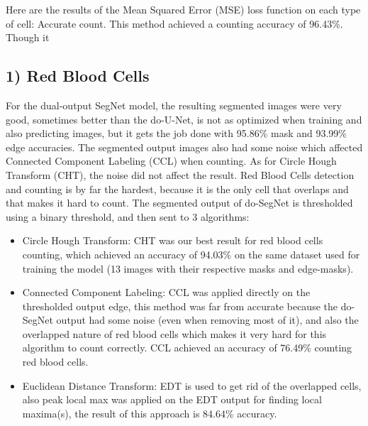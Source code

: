 \documentclass[conference]{IEEEtran}
\begin{document}
Here are the results of the Mean Squared Error (MSE) loss function on each type of cell:
Accurate count. This method achieved a counting accuracy of 96.43\%.
Though it
\subsection{1) Red Blood Cells}
For the dual-output SegNet model, the resulting segmented images were very good, sometimes better than the do-U-Net, is not as optimized when training and also predicting images, but it gets the job done with 95.86\% mask and 93.99\% edge accuracies. The segmented output images also had some noise which affected Connected Component Labeling (CCL) when counting. As for Circle Hough Transform (CHT), the noise did not affect the result. Red Blood Cells detection and counting is by far the hardest, because it is the only cell that overlaps and that makes it hard to count. The segmented output of do-SegNet is thresholded using a binary threshold, and then sent to 3 algorithms:
\begin{itemize}
\item Circle Hough Transform: CHT was our best result for red blood cells counting, which achieved an accuracy of 94.03\% on the same dataset used for training the model (13 images with their respective masks and edge-masks).
\item Connected Component Labeling: CCL was applied directly on the thresholded output edge, this method was far from accurate because the do-SegNet output had some noise (even when removing most of it), and also the overlapped nature of red blood cells which makes it very hard for this algorithm to count correctly. CCL achieved an accuracy of 76.49\% counting red blood cells.
\item Euclidean Distance Transform: EDT is used to get rid of the overlapped cells, also peak local max was applied on the EDT output for finding local maxima(s), the result of this approach is 84.64\% accuracy.
\end{itemize}
\end{document}
